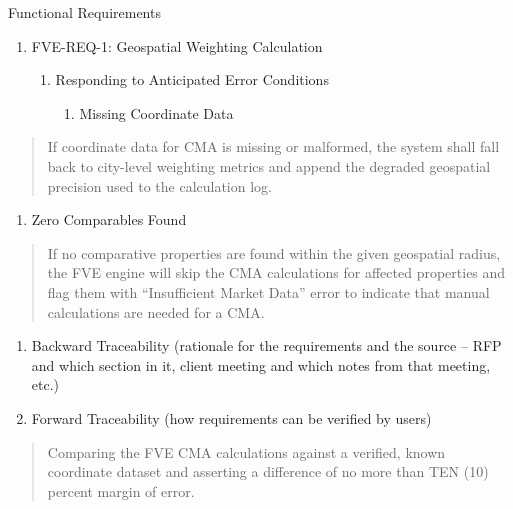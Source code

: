 Functional Requirements

\begin{enumerate}
\def\labelenumi{\Roman{enumi})}
\item
  FVE-REQ-1: Geospatial Weighting Calculation

  \begin{enumerate}
  \def\labelenumii{\alph{enumii}.}
  \item
    Responding to Anticipated Error Conditions

    \begin{enumerate}
    \def\labelenumiii{\roman{enumiii}.}
    \item
      Missing Coordinate Data
    \end{enumerate}
  \end{enumerate}
\end{enumerate}

\begin{quote}
If coordinate data for CMA is missing or malformed, the system shall
fall back to city-level weighting metrics and append the degraded
geospatial precision used to the calculation log.
\end{quote}

\begin{enumerate}
\def\labelenumi{\roman{enumi}.}
\setcounter{enumi}{1}
\item
  Zero Comparables Found
\end{enumerate}

\begin{quote}
If no comparative properties are found within the given geospatial
radius, the FVE engine will skip the CMA calculations for affected
properties and flag them with ``Insufficient Market Data'' error to
indicate that manual calculations are needed for a CMA.
\end{quote}

\begin{enumerate}
\def\labelenumi{\alph{enumi}.}
\setcounter{enumi}{1}
\item
  Backward Traceability (rationale for the requirements and the source
  -- RFP and which section in it, client meeting and which notes from
  that meeting, etc.)
\item
  Forward Traceability (how requirements can be verified by users)
\end{enumerate}

\begin{quote}
Comparing the FVE CMA calculations against a verified, known coordinate
dataset and asserting a difference of no more than TEN (10) percent
margin of error.
\end{quote}

